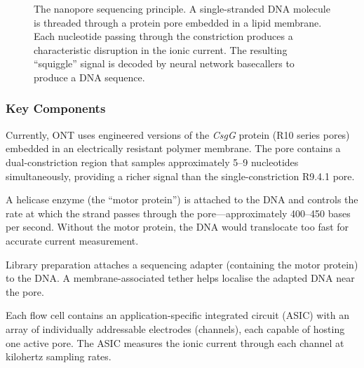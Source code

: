 \begin{figure}[htbp]
\caption[Nanopore sequencing principle]{The nanopore sequencing principle. A single-stranded DNA molecule is threaded through a protein pore embedded in a lipid membrane. Each nucleotide passing through the constriction produces a characteristic disruption in the ionic current. The resulting ``squiggle'' signal is decoded by neural network basecallers to produce a DNA sequence.}
\label{fig:nanopore}
\end{figure}

\subsubsection{Key Components}

\begin{description}[style=nextline, font=\bfseries]
  \item[Protein pore.] Currently, ONT uses engineered versions of the \textit{CsgG} protein (R10 series pores) embedded in an electrically resistant polymer membrane. The pore contains a dual-constriction region that samples approximately 5--9 nucleotides simultaneously, providing a richer signal than the single-constriction R9.4.1 pore.

  \item[Motor protein.] A helicase enzyme (the ``motor protein'') is attached to the DNA and controls the rate at which the strand passes through the pore---approximately 400--450 bases per second. Without the motor protein, the DNA would translocate too fast for accurate current measurement.

  \item[Adapter and tether.] Library preparation attaches a sequencing adapter (containing the motor protein) to the DNA. A membrane-associated tether helps localise the adapted DNA near the pore.

  \item[ASIC and sensor array.] Each flow cell contains an application-specific integrated circuit (ASIC) with an array of individually addressable electrodes (channels), each capable of hosting one active pore. The ASIC measures the ionic current through each channel at kilohertz sampling rates.
\end{description}


